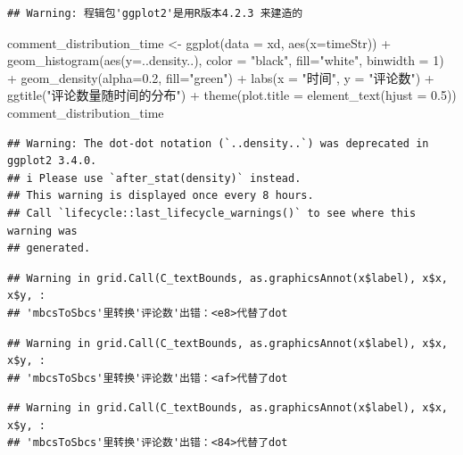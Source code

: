 \documentclass[
]{article}
\newenvironment{Shaded}{\begin{snugshade}}{\end{snugshade}}
\newcommand{\AttributeTok}[1]{\textcolor[rgb]{0.77,0.63,0.00}{#1}}
\newcommand{\DecValTok}[1]{\textcolor[rgb]{0.00,0.00,0.81}{#1}}
\newcommand{\FloatTok}[1]{\textcolor[rgb]{0.00,0.00,0.81}{#1}}
\newcommand{\FunctionTok}[1]{\textcolor[rgb]{0.00,0.00,0.00}{#1}}
\newcommand{\NormalTok}[1]{#1}
\newcommand{\OtherTok}[1]{\textcolor[rgb]{0.56,0.35,0.01}{#1}}
\newcommand{\SpecialCharTok}[1]{\textcolor[rgb]{0.00,0.00,0.00}{#1}}
\newcommand{\StringTok}[1]{\textcolor[rgb]{0.31,0.60,0.02}{#1}}
\begin{document}
\begin{verbatim}
## Warning: 程辑包'ggplot2'是用R版本4.2.3 来建造的
\end{verbatim}

\begin{Shaded}
\begin{Highlighting}[]
\NormalTok{comment\_distribution\_time }\OtherTok{\textless{}{-}} \FunctionTok{ggplot}\NormalTok{(}\AttributeTok{data =}\NormalTok{ xd, }\FunctionTok{aes}\NormalTok{(}\AttributeTok{x=}\NormalTok{timeStr)) }\SpecialCharTok{+} \FunctionTok{geom\_histogram}\NormalTok{(}\FunctionTok{aes}\NormalTok{(}\AttributeTok{y=}\NormalTok{..density..), }\AttributeTok{color =} \StringTok{"black"}\NormalTok{, }\AttributeTok{fill=}\StringTok{"white"}\NormalTok{, }\AttributeTok{binwidth =} \DecValTok{1}\NormalTok{) }\SpecialCharTok{+} 
 \FunctionTok{geom\_density}\NormalTok{(}\AttributeTok{alpha=}\FloatTok{0.2}\NormalTok{, }\AttributeTok{fill=}\StringTok{"green"}\NormalTok{) }\SpecialCharTok{+} \FunctionTok{labs}\NormalTok{(}\AttributeTok{x =} \StringTok{"时间"}\NormalTok{, }\AttributeTok{y =} \StringTok{"评论数"}\NormalTok{) }\SpecialCharTok{+} \FunctionTok{ggtitle}\NormalTok{(}\StringTok{"评论数量随时间的分布"}\NormalTok{) }\SpecialCharTok{+} \FunctionTok{theme}\NormalTok{(}\AttributeTok{plot.title =} \FunctionTok{element\_text}\NormalTok{(}\AttributeTok{hjust =} \FloatTok{0.5}\NormalTok{))}
\NormalTok{comment\_distribution\_time}
\end{Highlighting}
\end{Shaded}

\begin{verbatim}
## Warning: The dot-dot notation (`..density..`) was deprecated in ggplot2 3.4.0.
## i Please use `after_stat(density)` instead.
## This warning is displayed once every 8 hours.
## Call `lifecycle::last_lifecycle_warnings()` to see where this warning was
## generated.
\end{verbatim}

\begin{verbatim}
## Warning in grid.Call(C_textBounds, as.graphicsAnnot(x$label), x$x, x$y, :
## 'mbcsToSbcs'里转换'评论数'出错：<e8>代替了dot
\end{verbatim}

\begin{verbatim}
## Warning in grid.Call(C_textBounds, as.graphicsAnnot(x$label), x$x, x$y, :
## 'mbcsToSbcs'里转换'评论数'出错：<af>代替了dot
\end{verbatim}

\begin{verbatim}
## Warning in grid.Call(C_textBounds, as.graphicsAnnot(x$label), x$x, x$y, :
## 'mbcsToSbcs'里转换'评论数'出错：<84>代替了dot
\end{verbatim}
\end{document}
